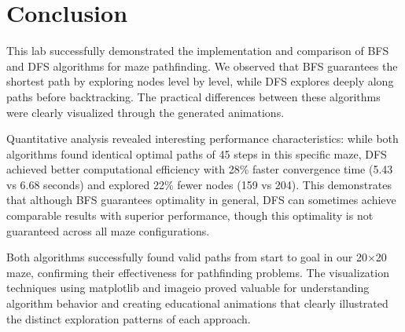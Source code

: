 \documentclass[a4paper, journal]{IEEEtran}
\begin{document}
\section{Conclusion}
This lab successfully demonstrated the implementation and comparison of BFS and DFS algorithms for maze pathfinding. We observed that BFS guarantees the shortest path by exploring nodes level by level, while DFS explores deeply along paths before backtracking. The practical differences between these algorithms were clearly visualized through the generated animations.

Quantitative analysis revealed interesting performance characteristics: while both algorithms found identical optimal paths of 45 steps in this specific maze, DFS achieved better computational efficiency with 28\% faster convergence time (5.43 vs 6.68 seconds) and explored 22\% fewer nodes (159 vs 204). This demonstrates that although BFS guarantees optimality in general, DFS can sometimes achieve comparable results with superior performance, though this optimality is not guaranteed across all maze configurations.

Both algorithms successfully found valid paths from start to goal in our 20×20 maze, confirming their effectiveness for pathfinding problems. The visualization techniques using matplotlib and imageio proved valuable for understanding algorithm behavior and creating educational animations that clearly illustrated the distinct exploration patterns of each approach.



\end{document}
